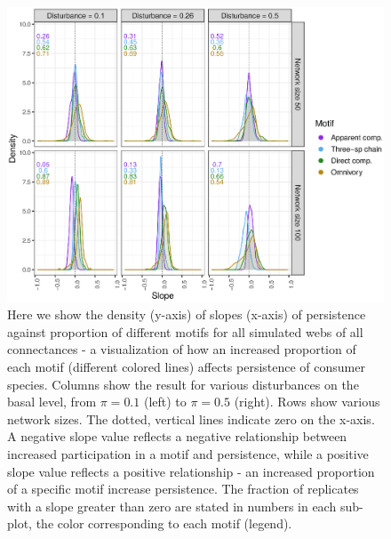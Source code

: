 \documentclass[12pt]{article}
\begin{document}
\begin{spacing}{2.0}
    
    \begin{figure}[hb!]
        \centering
            \includegraphics[width=\textwidth]{figures/prop_dens_bp_vs_S_allC.eps}
            \caption{Here we show the density (y-axis) of slopes (x-axis) of persistence against proportion of different motifs for all simulated webs of all connectances - a visualization of how an increased proportion of each motif (different colored lines) affects persistence of consumer species. Columns show the result for various disturbances on the basal level, from $\pi = 0.1$ (left) to $\pi = 0.5$ (right). Rows show various network sizes. The dotted, vertical lines indicate zero on the x-axis. A negative slope value reflects a negative relationship between increased participation in a motif and persistence, while a positive slope value reflects a positive relationship - an increased proportion of a specific motif increase persistence. The fraction of replicates with a slope greater than zero are stated in numbers in each sub-plot, the color corresponding to each motif (legend). }
            \label{fig:density_prop_S}
        \end{figure}    

    
    

\end{spacing}
\end{document}
